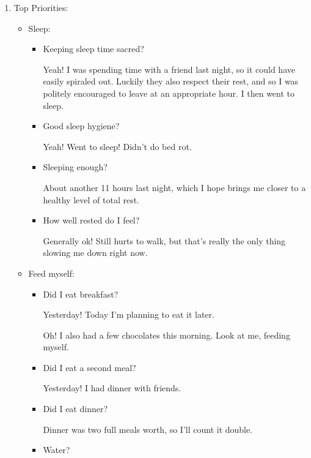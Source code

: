 \documentclass[12pt]{article}
\renewcommand{\,}{\textsuperscript{,}}
\begin{document}
\begin{enumerate}

\item Top Priorities:

\begin{itemize}

\item Sleep:

\begin{itemize}

\item Keeping sleep time sacred?

Yeah! I was spending time with a friend last night, so it could have easily spiraled out.  
Luckily they also respect their rest, and so I was politely encouraged to leave at an appropriate hour.  
I then went to sleep.

\item Good sleep hygiene?

Yeah! Went to sleep! Didn't do bed rot.

\item Sleeping enough?

About another 11 hours last night, which I hope brings me closer to a healthy level of total rest.

\item How well rested do I feel?

Generally ok! Still hurts to walk, but that's really the only thing slowing me down right now.

\end{itemize}

\item Feed myself:

\begin{itemize}

\item Did I eat breakfast?

Yesterday! Today I'm planning to eat it later.

Oh! I also had a few chocolates this morning. Look at me, feeding myself.

\item Did I eat a second meal?

Yesterday! I had dinner with friends.

\item Did I eat dinner?

Dinner was two full meals worth, so I'll count it double.

\item Water?


\end{itemize}
\end{itemize}
\end{enumerate}
\end{document}
